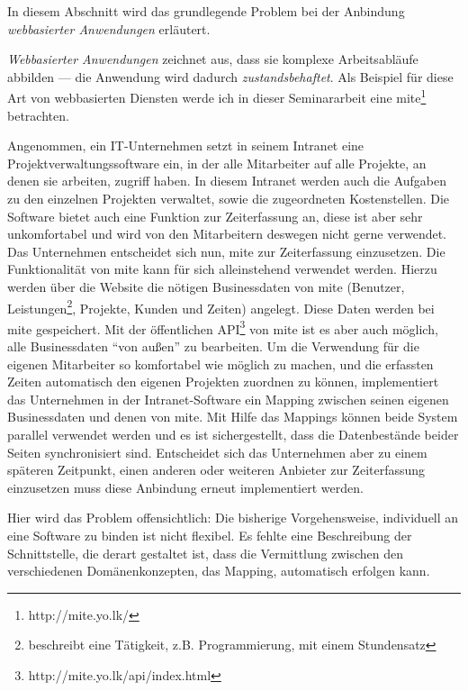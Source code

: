 In diesem Abschnitt wird das grundlegende Problem bei der Anbindung \emph{webbasierter Anwendungen} erläutert.

\bigskip

\emph{Webbasierter Anwendungen} zeichnet aus, dass sie komplexe Arbeitsabläufe abbilden --- die Anwendung wird dadurch \emph{zustandsbehaftet}. Als Beispiel für diese Art von webbasierten Diensten werde ich in dieser Seminararbeit eine \ac{mite}\footnote{http://mite.yo.lk/} betrachten. 

Angenommen, ein IT-Unternehmen setzt in seinem Intranet eine Projektverwaltungssoftware ein, in der alle Mitarbeiter auf alle Projekte, an denen sie arbeiten, zugriff haben. In diesem Intranet werden auch die Aufgaben zu den einzelnen Projekten verwaltet, sowie die zugeordneten Kostenstellen. Die Software bietet auch eine Funktion zur Zeiterfassung an, diese ist aber sehr unkomfortabel und wird von den Mitarbeitern deswegen nicht gerne verwendet. Das Unternehmen entscheidet sich nun, \ac{mite} zur Zeiterfassung einzusetzen. Die Funktionalität von \ac{mite} kann für sich alleinstehend verwendet werden. Hierzu werden über die Website die nötigen Businessdaten von \ac{mite} (Benutzer, Leistungen\footnote{beschreibt eine Tätigkeit, z.B. Programmierung, mit einem Stundensatz}, Projekte, Kunden und Zeiten) angelegt. Diese Daten werden bei \ac{mite} gespeichert. Mit der öffentlichen \acs{API}\footnote{http://mite.yo.lk/api/index.html} von \ac{mite} ist es aber auch möglich, alle Businessdaten "`von außen"' zu bearbeiten. Um die Verwendung für die eigenen Mitarbeiter so komfortabel wie möglich zu machen, und die erfassten Zeiten automatisch den eigenen Projekten zuordnen zu können, implementiert das Unternehmen in der Intranet-Software ein Mapping zwischen seinen eigenen Businessdaten und denen von \ac{mite}. Mit Hilfe das Mappings können beide System parallel verwendet werden und es ist sichergestellt, dass die Datenbestände beider Seiten synchronisiert sind. Entscheidet sich das Unternehmen aber zu einem späteren Zeitpunkt, einen anderen oder weiteren Anbieter zur Zeiterfassung einzusetzen muss diese Anbindung erneut implementiert werden.

Hier wird das Problem offensichtlich: Die bisherige Vorgehensweise, \ws individuell an eine Software zu binden ist nicht flexibel. Es fehlte eine Beschreibung der Schnittstelle, die derart gestaltet ist, dass die Vermittlung zwischen den verschiedenen Domänenkonzepten, das Mapping, automatisch erfolgen kann.


